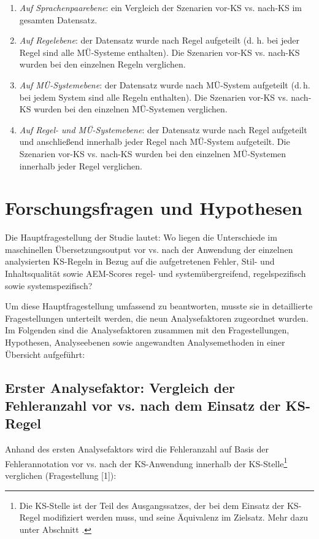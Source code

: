 \begin{enumerate}[label = {(\arabic*)}, align = left]
\item \textit{Auf Sprachenpaarebene}: ein Vergleich der Szenarien vor-KS vs. nach-KS im gesamten Datensatz.
\item \textit{Auf Regelebene}: der Datensatz wurde nach Regel aufgeteilt (d. h. bei jeder Regel sind alle MÜ-Systeme enthalten). Die Szenarien vor-KS vs. nach-KS wurden bei den einzelnen Regeln verglichen.
\item \textit{Auf MÜ-Systemebene}: der Datensatz wurde nach MÜ-System aufgeteilt (d.\,h. bei jedem System sind alle Regeln enthalten). Die Szenarien vor-KS vs. nach-KS wurden bei den einzelnen MÜ-Systemen verglichen.
\item \textit{Auf Regel- und MÜ-Systemebene}: der Datensatz wurde nach Regel aufgeteilt und anschließend innerhalb jeder Regel nach MÜ-System aufgeteilt. Die Szenarien vor-KS vs. nach-KS wurden bei den einzelnen MÜ-Systemen innerhalb jeder Regel verglichen.
\end{enumerate}

\section{\label{sec:1.3}Forschungsfragen und Hypothesen}

Die Hauptfragestellung der Studie lautet: Wo liegen die Unterschiede im maschinellen Übersetzungsoutput vor vs. nach der Anwendung der einzelnen analysierten KS-Regeln in Bezug auf die aufgetretenen Fehler, Stil- und Inhaltsqualität sowie AEM-Scores regel- und systemübergreifend, regelspezifisch sowie systemspezifisch?

Um diese Hauptfragestellung umfassend zu beantworten, musste sie in detaillierte Fragestellungen unterteilt werden, die neun Analysefaktoren zugeordnet wurden. Im Folgenden sind die Analysefaktoren zusammen mit den Fragestellungen, Hypothesen, Analyseebenen sowie angewandten Analysemethoden in einer Übersicht aufgeführt:

\subsection*{Erster Analysefaktor: Vergleich der Fehleranzahl vor vs. nach dem Einsatz der KS-Regel}

Anhand des ersten Analysefaktors wird die Fehleranzahl auf Basis der Fehlerannotation vor vs. nach der KS-Anwendung innerhalb der KS-Stelle\footnote{{{{Die KS-Stelle ist der Teil des Ausgangssatzes, der bei dem Einsatz der KS-Regel modifiziert werden muss, und seine Äquivalenz im Zielsatz. Mehr dazu unter Abschnitt .}}}} verglichen (Fragestellung [1]):


